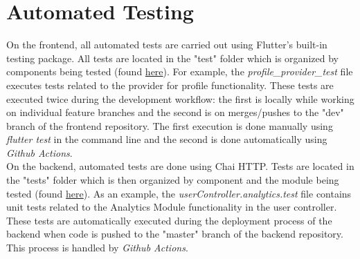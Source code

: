 \documentclass[12pt, titlepage]{article}
\begin{document}
\section{Automated Testing}

On the frontend, all automated tests are carried out using Flutter's built-in testing package.
All tests are located in the "test" folder which is organized by components being tested (found 
\href{https://github.com/allanfang1/grocery_spending_tracker_app/tree/main}{here}). For example,
the \textit{profile\_provider\_test} file executes tests related to the provider for profile functionality.
These tests are executed twice during the development workflow: the first is locally while working on
individual feature branches and the second is on merges/pushes to the "dev" branch of the frontend repository.
The first execution is done manually using \textit{flutter test} in the command line and the second is done
automatically using \textit{Github Actions}.\\

On the backend, automated tests are done using Chai HTTP. Tests are located in the "tests" folder which
is then organized by component and the module being tested 
(found \href{https://github.com/grocery-spending-tracker/grocery-spending-tracker-backend/tree/master/tests}{here}).
As an example, the \textit{userController.analytics.test} file contains unit tests related to the Analytics Module
functionality in the user controller.
These tests are automatically executed during the deployment process of the backend when code is pushed to the
"master" branch of the backend repository. This process is handled by \textit{Github Actions}.
\end{document}
